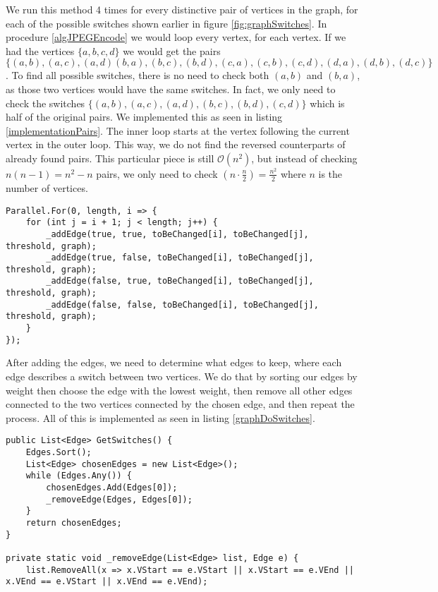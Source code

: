 We run this method 4 times for every distinctive pair of vertices in the graph, for each of the possible switches shown earlier in figure \ref{fig:graphSwitches}.
In procedure \ref{algJPEGEncode} we would loop every vertex, for each vertex.
If we had the vertices $\{a,b,c,d\}$ we would get the pairs $\{(a,b),(a,c),(a,d)(b,a),(b,c),(b,d),(c,a),(c,b),(c,d),(d,a),(d,b),(d,c)\}$.
To find all possible switches, there is no need to check both $(a,b)$ and $(b,a)$, as those two vertices would have the same switches.
In fact, we only need to check the switches $\{(a,b),(a,c),(a,d),(b,c),(b,d),(c,d)\}$ which is half of the original pairs.
We implemented this as seen in listing \ref{implementationPairs}.
The inner loop starts at the vertex following the current vertex in the outer loop.
This way, we do not find the reversed counterparts of already found pairs.
This particular piece is still $\mathcal{O}(n^2)$, but instead of checking $n(n-1)=n^2-n$ pairs, we only need to check $(n\cdot\frac{n}{2})=\frac{n^2}{2}$ where $n$ is the number of vertices. 


\begin{lstlisting}[firstnumber=655,label=implementationPairs]
Parallel.For(0, length, i => {
    for (int j = i + 1; j < length; j++) {
        _addEdge(true, true, toBeChanged[i], toBeChanged[j], threshold, graph);
        _addEdge(true, false, toBeChanged[i], toBeChanged[j], threshold, graph);
        _addEdge(false, true, toBeChanged[i], toBeChanged[j], threshold, graph);
        _addEdge(false, false, toBeChanged[i], toBeChanged[j], threshold, graph);
    }
});
\end{lstlisting}

After adding the edges, we need to determine what edges to keep, where each edge describes a switch between two vertices.
We do that by sorting our edges by weight then choose the edge with the lowest weight, then remove all other edges connected to the two vertices connected by the chosen edge, and then repeat the process.
All of this is implemented as seen in listing \ref{graphDoSwitches}.

\begin{lstlisting}[firstnumber=14,label=graphDoSwitches]
public List<Edge> GetSwitches() {
    Edges.Sort();
    List<Edge> chosenEdges = new List<Edge>();
    while (Edges.Any()) {
        chosenEdges.Add(Edges[0]);
        _removeEdge(Edges, Edges[0]);
    }
    return chosenEdges;
}

private static void _removeEdge(List<Edge> list, Edge e) {
    list.RemoveAll(x => x.VStart == e.VStart || x.VStart == e.VEnd || x.VEnd == e.VStart || x.VEnd == e.VEnd);

\end{lstlisting}

